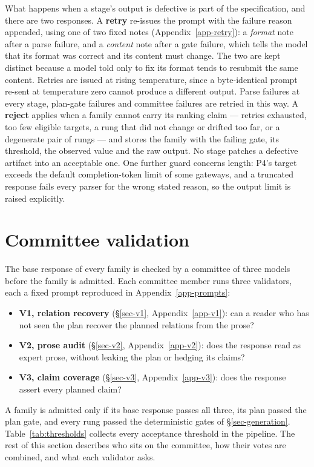 What happens when a stage's output is defective is part of the specification, and there are two responses. A
\textbf{retry} re-issues the prompt with the failure reason appended, using one of two fixed notes
(Appendix~\ref{app-retry}): a \emph{format} note after a parse failure, and a \emph{content} note after a gate
failure, which tells the model that its format was correct and its content must change. The two are kept distinct
because a model told only to fix its format tends to resubmit the same content. Retries are issued at rising
temperature, since a byte-identical prompt re-sent at temperature zero cannot produce a different output. Parse
failures at every stage, plan-gate failures and committee failures are retried in this way. A \textbf{reject}
applies when a family cannot carry its ranking claim --- retries exhausted, too few eligible targets, a rung that
did not change or drifted too far, or a degenerate pair of rungs --- and stores the family with the failing gate,
its threshold, the observed value and the raw output. No stage patches a defective artifact into an acceptable
one. One further guard concerns length: P4's target exceeds the default completion-token limit of some gateways,
and a truncated response fails every parser for the wrong stated reason, so the output limit is raised explicitly.

\section{Committee validation}
\label{sec-validation}

The base response of every family is checked by a committee of three models before the family is admitted. Each
committee member runs three validators, each a fixed prompt reproduced in Appendix~\ref{app-prompts}:
\begin{itemize}[leftmargin=1.4em,itemsep=1pt,topsep=2pt]
\item \textbf{V1, relation recovery} (\S\ref{sec-v1}, Appendix~\ref{app-v1}): can a reader who has not seen the
  plan recover the planned relations from the prose?
\item \textbf{V2, prose audit} (\S\ref{sec-v2}, Appendix~\ref{app-v2}): does the response read as expert prose,
  without leaking the plan or hedging its claims?
\item \textbf{V3, claim coverage} (\S\ref{sec-v3}, Appendix~\ref{app-v3}): does the response assert every
  planned claim?
\end{itemize}
A family is admitted only if its base response passes all three, its plan passed the plan gate, and every rung
passed the deterministic gates of \S\ref{sec-generation}. Table~\ref{tab:thresholds} collects every acceptance
threshold in the pipeline. The rest of this section describes who sits on the committee, how their votes are
combined, and what each validator asks.

